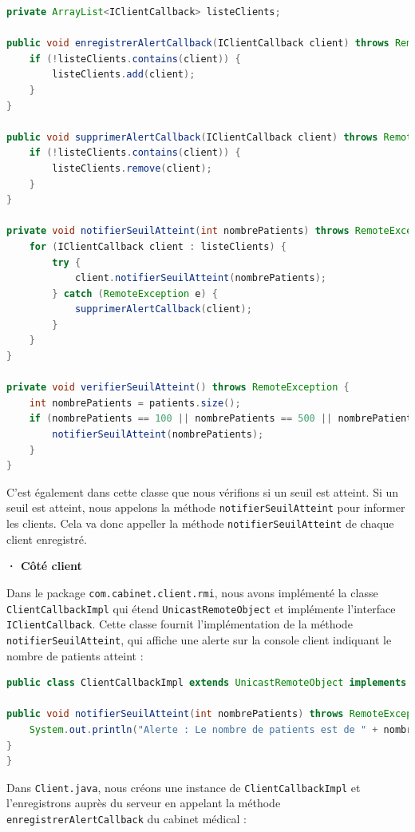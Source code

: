 \documentclass{article} %
\begin{document}
\begin{lstlisting}[language=Java]
private ArrayList<IClientCallback> listeClients;

public void enregistrerAlertCallback(IClientCallback client) throws RemoteException {
    if (!listeClients.contains(client)) {
        listeClients.add(client);
    }
}

public void supprimerAlertCallback(IClientCallback client) throws RemoteException {
    if (!listeClients.contains(client)) {
        listeClients.remove(client);
    }
}

private void notifierSeuilAtteint(int nombrePatients) throws RemoteException {
    for (IClientCallback client : listeClients) {
        try {
            client.notifierSeuilAtteint(nombrePatients);
        } catch (RemoteException e) {
            supprimerAlertCallback(client);
        }
    }
}

private void verifierSeuilAtteint() throws RemoteException {
    int nombrePatients = patients.size();
    if (nombrePatients == 100 || nombrePatients == 500 || nombrePatients == 1000) {
        notifierSeuilAtteint(nombrePatients);
    }
}
\end{lstlisting}

C'est également dans cette classe que nous vérifions si un seuil est atteint.
Si un seuil est atteint, nous appelons la méthode \texttt{notifierSeuilAtteint} pour informer les clients.
Cela va donc appeller la méthode \texttt{notifierSeuilAtteint} de chaque client enregistré.

\bigskip
\textbf{· Côté client}
\bigskip

Dans le package \texttt{com.cabinet.client.rmi}, nous avons implémenté la classe \texttt{ClientCallbackImpl} 
qui étend \texttt{UnicastRemoteObject} et implémente l'interface \texttt{IClientCallback}. 
Cette classe fournit l'implémentation de la méthode \texttt{notifierSeuilAtteint}, 
qui affiche une alerte sur la console client indiquant le nombre de patients atteint : 

\begin{lstlisting}[language=Java]
public class ClientCallbackImpl extends UnicastRemoteObject implements IClientCallback {

public void notifierSeuilAtteint(int nombrePatients) throws RemoteException {
    System.out.println("Alerte : Le nombre de patients est de " + nombrePatients);
}
}
\end{lstlisting}

Dans \texttt{Client.java}, nous créons une instance de \texttt{ClientCallbackImpl} et 
l'enregistrons auprès du serveur en appelant la méthode \texttt{enregistrerAlertCallback} du cabinet médical :
\end{document}

